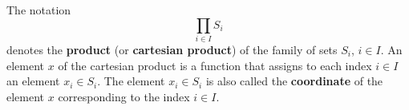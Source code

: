 The notation
$$
\prod_{i \in I} S_i
$$
denotes the \textbf{product} (or \textbf{cartesian product}) of the family of sets $S_i$, $i \in I$. An element $x$ of the cartesian product is a function that assigns to each index $i \in I$ an element $x_i \in S_i$. The element $x_i \in S_i$ is also called the \textbf{coordinate} of the element $x$ corresponding to the index $i \in I$.
